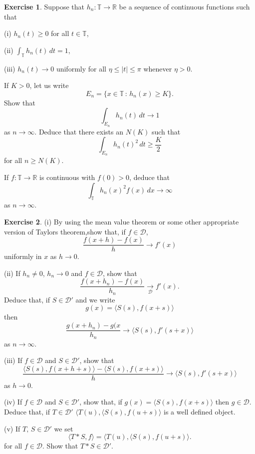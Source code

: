 \documentclass[12pt]{article}
\theoremstyle{definition}
\newtheorem{question}{Exercise}[section]
\newcommand{\arrowD}{\underset{\mathcal D}{\rightarrow}}
\begin{document}
\begin{question}\label{explosion}
Suppose that $h_{n}:{\mathbb T}\rightarrow{\mathbb R}$
be a sequence of continuous functions such that

(i) $h_{n}(t)\geq 0$ for all $t\in{\mathbb T}$,

(ii) ${\displaystyle \int_{\mathbb T}h_{n}(t)\,dt=1}$,

(iii) $h_{n}(t)\rightarrow 0$ uniformly for all $\eta\leq |t|\leq \pi$
whenever $\eta>0$.

\noindent If $K>0$, let us write
\[E_{n}=\{x\in {\mathbb T}\,:\,h_{n}(x)\geq K\}.\]
Show that
\[\int_{E_{n}}h_{n}(t)\,dt\rightarrow 1\]
as $n\rightarrow\infty$. Deduce that there exists an $N(K)$ such that
\[\int_{E_{n}}h_{n}(t)^{2}\,dt\geq \frac{K}{2}\]
for all $n\geq N(K)$.

If $f:{\mathbb T}\rightarrow{\mathbb R}$ is continuous
with $f(0)>0$, deduce that
\[\int_{\mathbb T}h_{n}(x)^{2}f(x)\,dx\rightarrow\infty\]
as $n\rightarrow \infty$.
\end{question}

\begin{question}\label{work convolution}
(i) By using the mean value theorem
or some other appropriate version of Taylors theorem,show that,
if $f\in{\mathcal D}$,
\[\frac{f(x+h)-f(x)}{h}\rightarrow f'(x)\]
uniformly in $x$ as $h\rightarrow 0$.

(ii) If $h_{n}\neq 0$, $h_{n}\rightarrow 0$ and
$f\in{\mathcal D}$, show that
\[\frac{f(x+h_{n})-f(x)}{h_{n}}\arrowD f'(x).\]
Deduce that, if $S\in{\mathcal D}'$ and we write
\[g(x)=\langle S(s),f(x+s)\rangle\]
then
\[\frac{g(x+h_{n})-g(x}{h_{n}}\rightarrow\langle S(s),f'(s+x)\rangle\]
as $n\rightarrow\infty$.

(iii) If $f\in{\mathcal D}$ and $S\in{\mathcal D}'$,
show that
\[\frac{\langle S(s),f(x+h+s)\rangle-\langle S(s),f(x+s)\rangle}{h}
\rightarrow \langle S(s),f'(s+x)\rangle\]
as $h\rightarrow 0$.

(iv) If $f\in{\mathcal D}$ and $S\in{\mathcal D}'$,
show that, if $g(x)=\langle S(s),f(x+s)\rangle$
then $g\in{\mathcal D}$. Deduce that, if $T\in{\mathcal D}'$
$\langle T(u),\langle S(s),f(u+s)\rangle$
is a well defined object.

(v) If $T,\,S\in{\mathcal D}'$
we set
\[\langle T*S,f\rangle=\langle T(u),\langle S(s),f(u+s)\rangle.\]
for all $f\in {\mathcal D}$. Show that $T*S\in{\mathcal D}'$.
\end{question}
\end{document}
